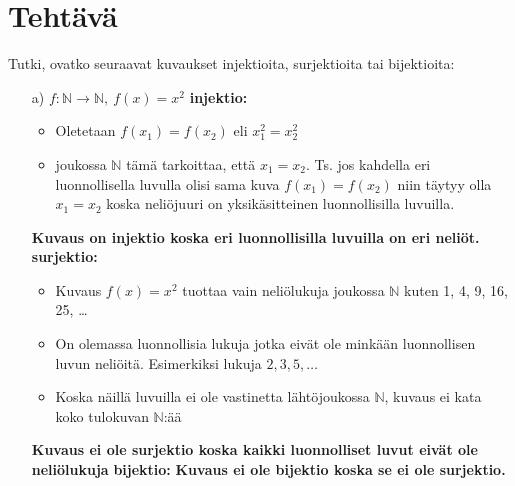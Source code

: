 \documentclass{article}
\newcounter{tehtava}
\begin{document}
        \section*{Tehtävä \thetehtava}
        Tutki, ovatko seuraavat kuvaukset injektioita, surjektioita tai bijektioita:
        \begin{itemize}

            \item[a)] $f : \mathbb{N} \rightarrow \mathbb{N}, \ f(x) = x^2$\newline
            \textbf{injektio:}
            \begin{itemize}
                \item Oletetaan $f(x_1) = f(x_2)$ eli $x_1^2 = x_2^2$
                \item joukossa $\mathbb{N}$ tämä tarkoittaa, että $x_1 = x_2$. Ts. jos kahdella eri luonnollisella luvulla olisi sama kuva $f(x_1) = f(x_2)$ niin täytyy olla $x_1 = x_2$ koska neliöjuuri on yksikäsitteinen luonnollisilla luvuilla.
            \end{itemize}
            \textbf{Kuvaus on injektio koska eri luonnollisilla luvuilla on eri neliöt.}\linebreak
            \textbf{surjektio:}
            \begin{itemize}
                \item Kuvaus $f(x) = x^2$ tuottaa vain neliölukuja joukossa $\mathbb{N}$ kuten 1, 4, 9, 16, 25, \dots
                \item On olemassa luonnollisia lukuja jotka eivät ole minkään luonnollisen luvun neliöitä. Esimerkiksi lukuja \( 2, 3, 5, \dots\)
                \item Koska näillä luvuilla ei ole vastinetta lähtöjoukossa $\mathbb{N}$, kuvaus ei kata koko tulokuvan $\mathbb{N}$:ää
            \end{itemize}
            \textbf{Kuvaus ei ole surjektio koska kaikki luonnolliset luvut eivät ole neliölukuja}\linebreak
            \textbf{bijektio:}\newline
            \textbf{Kuvaus ei ole bijektio koska se ei ole surjektio.}


\end{itemize}
\end{document}
